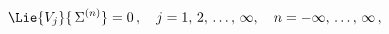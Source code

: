 \begin{equation*}
  \Lie{V_{j}}{\,\Sigma^{(n)}} = 0\,,\quad
  {j}=1,\,2,\,\ldots,\,\infty,\quad
  {n}=-\infty,\,\ldots,\,\infty\,,
\end{equation*}

